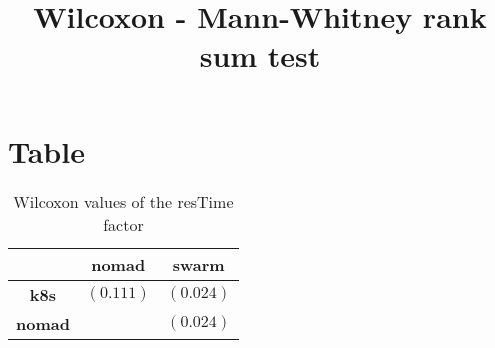 \documentclass{article}
\title{Wilcoxon - Mann-Whitney rank sum test}
\author{}
\begin{document}
\maketitle
\section{Table}
\begin{table}[!htp]
  \caption{Wilcoxon values of the resTime factor}
  \label{table:resTime}
  \centering
  \begin{scriptsize}
  \begin{tabular}{c|cc}
      & \textbf{nomad} & \textbf{swarm} \\\hline
      \textbf{k8s} & $(0.111) $ & $ (0.024)$ \\
      \textbf{nomad} & $ $ & $ (0.024)$ \\
  \end{tabular}
  \end{scriptsize}
\end{table}
\end{document}

